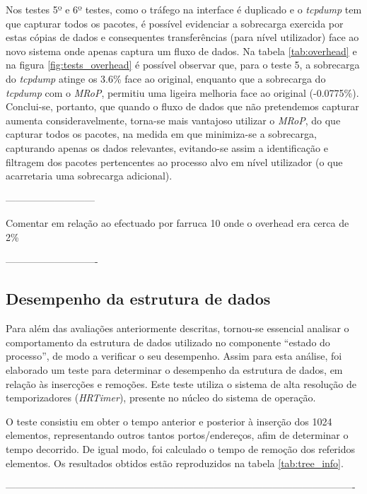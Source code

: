 Nos testes 5º e 6º testes, como o tráfego na interface é duplicado e o \textit{tcpdump} tem que capturar todos os pacotes, é possível evidenciar a sobrecarga exercida por estas cópias de dados e consequentes transferências (para nível utilizador) face ao novo sistema onde apenas captura um fluxo de dados.
Na tabela \ref{tab:overhead} e na figura \ref{fig:tests_overhead} é possível observar que, para o teste 5, a sobrecarga do \textit{tcpdump} atinge os 3.6\% face ao original, enquanto que a sobrecarga do \textit{tcpdump} com o \textit{MRoP}, permitiu uma ligeira melhoria face ao original (-0.0775\%).
Conclui-se, portanto, que quando o fluxo de dados que não pretendemos capturar aumenta consideravelmente, torna-se mais vantajoso utilizar o \textit{MRoP}, do que capturar todos os pacotes, na medida em que minimiza-se a sobrecarga, capturando apenas os dados relevantes, evitando-se assim a identificação e filtragem dos pacotes pertencentes ao processo alvo em nível utilizador (o que acarretaria uma sobrecarga adicional).

---------------------------

Comentar em relação ao efectuado por farruca 10 onde o overhead era cerca de 2\% 

----------------------------

\subsection{Desempenho da estrutura de dados}

Para além das avaliações anteriormente descritas, tornou-se essencial analisar o comportamento da estrutura de dados utilizado no componente “estado do processo”, de modo a verificar o seu desempenho.
Assim para esta análise, foi elaborado um teste para determinar o desempenho da estrutura de dados, em relação às insercções e remoções.
Este teste utiliza o sistema de alta resolução de temporizadores (\textit{HRTimer})\cite{hrtimerKernel}, presente no núcleo do sistema de operação.

O teste consistiu em obter o tempo anterior e posterior à inserção dos 1024 elementos, representando outros tantos portos/endereços, afim de determinar o tempo decorrido.
De igual modo, foi calculado o tempo de remoção dos referidos elementos.
Os resultados obtidos estão reproduzidos na tabela \ref{tab:tree_info}.


----------------------------------------------------------------------------------------------------------

